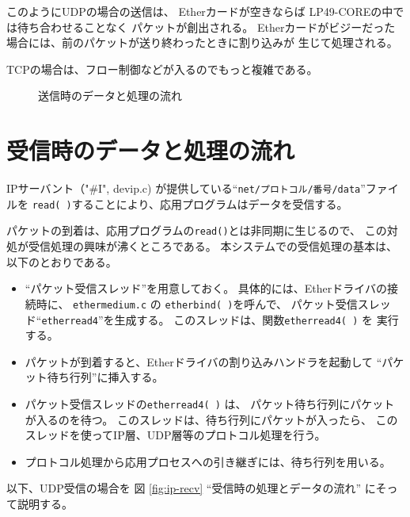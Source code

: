  このようにUDPの場合の送信は、
Etherカードが空きならば LP49-COREの中では待ち合わせることなく
パケットが創出される。
Etherカードがビジーだった場合には、前のパケットが送り終わったときに割り込みが
生じて処理される。

TCPの場合は、フロー制御などが入るのでもっと複雑である。


\begin{figure}[htb]
  \begin{center}
   \epsfxsize=440pt
    \caption{送信時のデータと処理の流れ}
    \label{fig:txmit}
  \end{center}
\end{figure}




\section{ 受信時のデータと処理の流れ}

  IPサーバント（"\#I", devip.c) が提供している``{\tt net/プロトコル/番号/data}''ファイルを
  \verb|read( )|することにより、応用プログラムはデータを受信する。

  パケットの到着は、応用プログラムの\verb|read()|とは非同期に生じるので、
  この対処が受信処理の興味が沸くところである。
  本システムでの受信処理の基本は、以下のとおりである。

\begin{itemize}
\item  ``パケット受信スレッド''を用意しておく。
      具体的には、Etherドライバの接続時に、
      {\tt ethermedium.c} の \verb|etherbind( )|を呼んで、
      パケット受信スレッド``{\tt etherread4}''を生成する。
      このスレッドは、関数\verb|etherread4( )| を 実行する。

\item  パケットが到着すると、Etherドライバの割り込みハンドラを起動して
       ``パケット待ち行列''に挿入する。

\item  パケット受信スレッドの\verb|etherread4( )| は、
       パケット待ち行列にパケットが入るのを待つ。
      このスレッドは、待ち行列にパケットが入ったら、
      このスレッドを使ってIP層、UDP層等のプロトコル処理を行う。

\item  プロトコル処理から応用プロセスへの引き継ぎには、待ち行列を用いる。
\end{itemize}




      以下、UDP受信の場合を 図 \ref{fig:ip-recv}  
      ``受信時の処理とデータの流れ'' にそって説明する。

